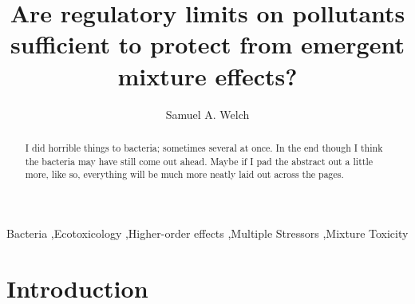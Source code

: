 \documentclass[final,1p,times]{elsarticle}
\begin{document}
\begin{frontmatter}


\title{Are regulatory limits on pollutants sufficient to protect from emergent mixture effects?}




\author{Samuel A. Welch}

\address{Silwood Park, Imperial College London, United Kingdom}

\begin{abstract}
I did horrible things to bacteria; sometimes several at once. In the end though I think the bacteria may have still come out ahead. Maybe if I pad the abstract out a little more, like so, everything will be much more neatly laid out across the pages. 
\end{abstract}

\begin{keyword}
Bacteria \sep Ecotoxicology \sep Higher-order effects \sep Multiple Stressors \sep Mixture Toxicity


\end{keyword}

\end{frontmatter}

\linenumbers

\section{Introduction}
\label{S:1}
\end{document}
